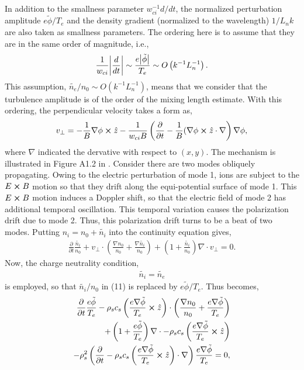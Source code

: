 In addition to the smallness parameter $w_{ci}^{-1} d/dt$, the normalized perturbation amplitude $e \tilde{\phi}/ T_e$ and the density gradient (normalized to the wavelength) $1/L_n k$ are also taken as smallness parameters. The ordering here is to assume that they are in the same order of magnitude, i.e.,
\begin{align}
	\frac{1}{w_{ci}} \abs{\frac{d}{dt}} \sim \frac{e \abs{\tilde{\phi}}}{T_e} \sim O \left(k^{-1} L_n^{-1} \right).
\end{align}
This assumption, $\tilde{n_e}/n_0 \sim O \left(k^{-1} L_n^{-1} \right)$, means that we consider that the turbulence amplitude is of the order of the mixing length estimate. With this ordering, the perpendicular velocity takes a form as, 
\begin{align}
	v_{\perp} = - \frac{1}{B} \nabla \phi \cross \hat{z} - \frac{1}{w_{ci} B} \left(\frac{\partial}{\partial t} - \frac{1}{B} (\nabla \phi \cross \hat{z} \cdot \nabla  \right) \nabla \phi,
\end{align}
where $\nabla$ indicated the dervative with respect to $(x,y)$. The mechanism is illustrated in Figure A1.2 in \cite{diamond_itoh_itoh_2010}. Consider there are two modes obliquely propagating. Owing to the electric perturbation of mode 1, ions are subject to the $E \cross B$ motion so that they drift along the equi-potential surface of mode 1. This $E \cross B$ motion induces a Doppler shift, so that the electric field of mode 2 has additional temporal oscillation. This temporal variation causes the polarization drift due to mode 2. Thus, this polarization drift turns to be a beat of two modes. Putting $n_i = n_0 + \tilde{n_i}$ into the continuity equation gives, 
\begin{align}
	\frac{\partial}{\partial t} \frac{\tilde{n_i}}{n_0} + v_{\perp} \cdot \left(\frac{\nabla n_0}{n_0} + \frac{\nabla \tilde{n_i}}{n_0} \right) + \left(1 + \frac{\tilde{n_i}}{n_0} \right) \nabla \cdot v_{\perp} = 0.
\end{align}
Now, the charge neutrality condition, 
\begin{align}
	\tilde{n_i} = \tilde{n_e}
\end{align}
is employed, so that $\tilde{n_i}/n_0$ in (11) is replaced by $e \tilde{\phi}/T_e$. Thus becomes, 
\begin{align}
\begin{split}
	\frac{\partial}{\partial t} \frac{e \tilde{\phi}}{T_e} - \rho_s c_s \left(\frac{e \nabla \tilde{\phi}}{T_e} \cross \hat{z} \right) \cdot \left(\frac{\nabla n_0}{n_0} + \frac{e \nabla \tilde{\phi}}{T_e} \right) \\
	 + \left(1 + \frac{e \tilde{\phi}}{T_e} \right) \nabla \cdot - \rho_s c_s \left(\frac{e \nabla \tilde{\phi}}{T_e} \cross \hat{z} \right) \\
	 - \rho_s^2 \left(\frac{\partial}{\partial t} - \rho_s c_s \left(\frac{e \nabla \tilde{\phi}}{T_e} \cross \hat{z} \right) \cdot \nabla \right) \frac{e \nabla \tilde{\phi}}{T_e} = 0,
\end{split}
\end{align}
